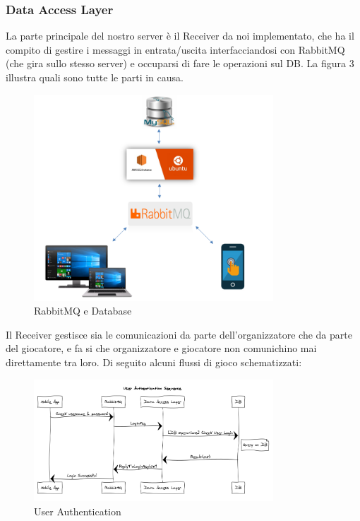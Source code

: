 \documentclass[12pt, italian]{article}
\begin{document}
\subsubsection{Data Access Layer}
La parte principale del nostro server è il Receiver da noi implementato, che ha il compito di gestire i messaggi in entrata/uscita interfacciandosi con RabbitMQ (che gira sullo stesso server) e occuparsi di fare le operazioni sul DB. La figura 3 illustra quali sono tutte le parti in causa.

\begin{figure}[H]
	\centering
	\includegraphics[width=0.8\textwidth]{img/rabbit.png}
	\caption{RabbitMQ e Database}
\end{figure}

Il Receiver gestisce sia le comunicazioni da parte dell'organizzatore che da parte del giocatore, e fa si che organizzatore e giocatore non comunichino mai direttamente tra loro. Di seguito alcuni flussi di gioco schematizzati:

\begin{figure}[H]
	\centering
	\includegraphics[width=0.8\textwidth]{img/SequenceDiagram/userLogin.png}
	\caption{User Authentication}
\end{figure}
\end{document}
